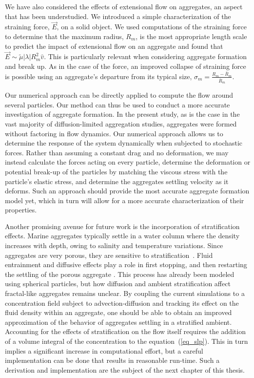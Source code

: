 We have also considered the effects of extensional flow on aggregates, an aspect that has been understudied. We introduced a simple characterization of the straining force, $\vec{E}$, on a solid object. We used computations of the straining force to determine that the maximum radius, $R_m$, is the most appropriate length scale to predict the impact of extensional flow on an aggregate and found that $\vec{E} \sim \tilde{\mu} |\lambda| R_m^2 \hat{v}$. This is particularly relevant when considering aggregate formation and break up. As in the case of the force, an improved collapse
of straining force is 
possible using an aggregate's departure from its typical size, $\sigma_m = \frac{R_m - \bar{R}_m}{\bar{R}_m}$. 


Our numerical approach can be directly applied to compute the flow around several particles. Our method can thus be used to conduct a more accurate investigation of aggregate formation. In the present study, as is the case in the vast majority of diffusion-limited aggregation studies, aggregates were formed without factoring in flow dynamics. Our numerical approach allows us to determine the response of the system dynamically when subjected to stochastic forces. Rather than assuming a constant drag and no deformation, we may instead calculate the forces acting on every particle, determine the deformation or potential break-up of the particles by matching the viscous stress with the particle's elastic stress, and determine the aggregates settling velocity as it deforms. Such an approach should provide the most accurate aggregate formation model yet, which in turn will allow for a more accurate characterization of their properties.

Another promising avenue for future work is the incorporation of stratification effects. Marine aggregates typically settle in a water column where the density increases with depth, owing to salinity and temperature variations. Since aggregates are very porous, they are sensitive to stratification~\cite{prairie_delayed_2013}. 
Fluid entrainment and diffusive effects play a role in first stopping, and then restarting the settling of the porous aggregate
\cite{panah_simulations_2017}. This process has already been modeled using spherical particles, but how diffusion and ambient stratification affect fractal-like aggregates remains unclear. By coupling the current simulations to a concentration field subject to advection-diffusion and tracking its effect on the fluid density within an aggregate, one should be able to obtain an improved approximation of the behavior of aggregates settling in a stratified ambient. 
Accounting for the effects of stratification on the flow itself requires the addition of a volume integral of the concentration to the equation~(\ref{eq_slp}). This in turn implies a significant increase in computational effort, but a careful implementation can be done that results in reasonable run-time. Such a derivation and implementation are the subject of the next chapter of this thesis. 

